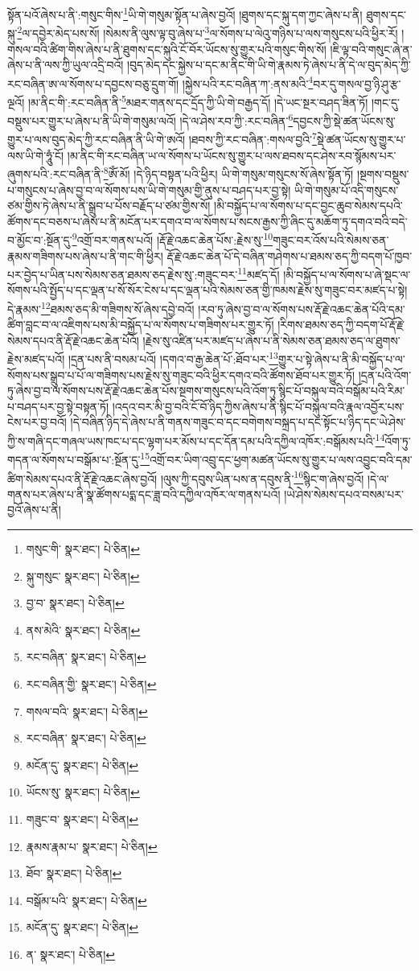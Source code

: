 སྟོན་པའོ་ཞེས་པ་ནི་:གསུང་གིས་\footnote{གསུང་གི་  སྣར་ཐང་།  པེ་ཅིན། }ཡི་གེ་གསུམ་སྟོན་པ་ཞེས་བྱའོ། །ཐུགས་དང་སྐུ་དག་ཀྱང་ཞེས་པ་ནི། ཐུགས་དང་སྐུ་\footnote{སྐུ་གསུང་  སྣར་ཐང་།  པེ་ཅིན། }ལ་དབྱེར་མེད་པས་སོ། །སེམས་ནི་ལུས་ལྟ་བུ་ཞེས་པ་\footnote{བྱ་བ་  སྣར་ཐང་།  པེ་ཅིན། }ལ་སོགས་པ་ལེའུ་གཉིས་པ་ལས་གསུངས་པའི་ཕྱིར་རོ། །གསལ་བའི་ཚིག་གིས་ཞེས་པ་ནི་ཐུགས་དང་སྐུའི་ངོ་བོར་ཡོངས་སུ་གྱུར་པའི་གསུང་གིས་སོ། །ཇི་ལྟ་བའི་གསུང་ཞེ་ན་ཞེས་པ་ནི་ལས་ཀྱི་ཡུལ་འདྲི་བའོ། །བུད་མེད་དང་སྐྱེས་པ་དང་མ་ནིང་གི་ཡི་གེ་རྣམས་ཏེ་ཞེས་པ་ནི་དེ་ལ་བུད་མེད་ཀྱི་རང་བཞིན་ཨ་ལ་སོགས་པ་དབྱངས་བཅུ་དྲུག་གོ། །སྐྱེས་པའི་རང་བཞིན་ཀ་:ནས་མའི་\footnote{ནས་མེའི་  སྣར་ཐང་།  པེ་ཅིན། }བར་དུ་གསལ་བྱ་ཉི་ཤུ་རྩ་ལྔའོ། །མ་ནིང་གི་:རང་བཞིན་ནི་\footnote{རང་བཞིན་  སྣར་ཐང་།  པེ་ཅིན། }མཐར་གནས་དང་དྲོད་ཀྱི་ཡི་གེ་བརྒྱད་དོ། །དེ་ཡང་སྔར་བཤད་ཟིན་ཏོ། །གང་དུ་བསྡུས་པར་གྱུར་པ་ཞེས་པ་ནི་ཡི་གེ་གསུམ་ལའོ། །དེ་ལ་ཤེས་རབ་ཀྱི་:རང་བཞིན་\footnote{རང་བཞིན་གྱི་  སྣར་ཐང་།  པེ་ཅིན། }དབྱངས་ཀྱི་སྡེ་ཚན་ཡོངས་སུ་གྱུར་པ་ལས་བུད་མེད་ཀྱི་རང་བཞིན་ནི་ཡི་གེ་ཨའོ། །ཐབས་ཀྱི་རང་བཞིན་:གསལ་བྱའི་\footnote{གསལ་བའི་  སྣར་ཐང་།  པེ་ཅིན། }སྡེ་ཚན་ཡོངས་སུ་གྱུར་པ་ལས་ཡི་གེ་ཧཱུཾ་ངོ། །མ་ནིང་གི་རང་བཞིན་ཡ་ལ་སོགས་པ་ཡོངས་སུ་གྱུར་པ་ལས་ཐབས་དང་ཤེས་རབ་སྙོམས་པར་ཞུགས་པའི་:རང་བཞིན་ནི་\footnote{རང་བཞིན་  སྣར་ཐང་།  པེ་ཅིན། }ཨོཾ་མོ། །དེ་ཉིད་བསྟན་པའི་ཕྱིར། ཡི་གེ་གསུམ་གསུངས་སོ་ཞེས་སྟོན་ཏོ། །སྔགས་བསྡུས་པ་གསུངས་པ་ཞེས་བྱ་བ་ལ་སོགས་པས་ཡི་གེ་གསུམ་གྱི་ནུས་པ་བཤད་པར་བྱ་སྟེ། ཡི་གེ་གསུམ་པོ་འདི་གསུངས་ཙམ་གྱིས་ཏེ་ཞེས་པ་ནི་སྒྲུབ་པ་པོས་བརྗོད་པ་ཙམ་གྱིས་སོ། །མི་བསྐྱོད་པ་ལ་སོགས་པ་དང་བྱང་ཆུབ་སེམས་དཔའི་ཚོགས་དང་བཅས་པ་ཞེས་པ་ནི་མངོན་པར་དགའ་བ་ལ་སོགས་པ་སངས་རྒྱས་ཀྱི་ཞིང་དུ་མཆོག་ཏུ་དགའ་བའི་བདེ་བ་མྱོང་བ་:སྔོན་དུ་\footnote{མངོན་དུ་  སྣར་ཐང་།  པེ་ཅིན། }འགྲོ་བར་གནས་པའོ། །རྡོ་རྗེ་འཆང་ཆེན་པོས་:རྗེས་སུ་\footnote{ཡོངས་སུ་  སྣར་ཐང་།  པེ་ཅིན། }གཟུང་བར་འོས་པའི་སེམས་ཅན་རྣམས་གཟིགས་པས་ཞེས་པ་ནི་གང་གི་ཕྱིར། རྡོ་རྗེ་འཆང་ཆེན་པོ་དེ་བཞིན་གཤེགས་པ་ཐམས་ཅད་ཀྱི་བདག་པོ་ཁྱབ་པར་བྱེད་པ་ཡིན་པས་སེམས་ཅན་ཐམས་ཅད་རྗེས་སུ་:གཟུང་བར་\footnote{གཟུང་བ་  སྣར་ཐང་།  པེ་ཅིན། }མཛད་དོ། །མི་བསྐྱོད་པ་ལ་སོགས་པ་ཞེ་སྡང་ལ་སོགས་པའི་སྤྱོད་པ་དང་ལྡན་པ་སོ་སོར་ངེས་པ་དང་ལྡན་པའི་སེམས་ཅན་གྱི་ཁམས་རྗེས་སུ་གཟུང་བར་མཛད་པ་སྟེ། དེ་རྣམས་\footnote{རྣམས་རྣམ་པ་  སྣར་ཐང་།  པེ་ཅིན། }ཐམས་ཅད་མི་གཟིགས་སོ་ཞེས་དབྱེ་བའོ། །རབ་ཏུ་ཞེས་བྱ་བ་ལ་སོགས་པས་རྡོ་རྗེ་འཆང་ཆེན་པོའི་དམ་ཚིག་བླང་བ་ལ་འཇིགས་པས་མི་བསྐྱོད་པ་ལ་སོགས་པ་གཟིགས་པར་གྱུར་ཏོ། །རིགས་ཐམས་ཅད་ཀྱི་བདག་པོ་རྡོ་རྗེ་སེམས་དཔའ་ནི་རྡོ་རྗེ་འཆང་ཆེན་པོའོ། །རྗེས་སུ་འཛིན་པར་མཛད་པ་ཞེས་པ་ནི་སེམས་ཅན་ཐམས་ཅད་ལ་ཐུགས་རྗེས་མཛད་པའོ། །དྲན་པས་ནི་བསམ་པའོ། །དགའ་བ་རྒྱ་ཆེན་པོ་:ཐོབ་པར་\footnote{ཐོབ་  སྣར་ཐང་།  པེ་ཅིན། }གྱུར་པ་སྟེ་ཞེས་པ་ནི་མི་བསྐྱོད་པ་ལ་སོགས་པས་སྒྲུབ་པ་པོ་ལ་གཟིགས་པས་རྗེས་སུ་གཟུང་བའི་ཕྱིར་དགའ་བའི་ཚོགས་ཐོབ་པར་གྱུར་ཏོ། །དྲན་པའི་འོག་ཏུ་ཞེས་བྱ་བ་ལ་སོགས་པས་རྡོ་རྗེ་འཆང་ཆེན་པོས་སྔགས་གསུངས་པའི་འོག་ཏུ་སྙིང་པོ་བསྐུལ་བའི་བསྒོམ་པའི་རིམ་པ་བཤད་པར་བྱ་སྟེ་བསྟན་ཏོ། །འདའ་བར་མི་བྱ་བའི་ངོ་བོ་ཉིད་ཀྱིས་ཞེས་པ་ནི་སྙིང་པོ་བསྐུལ་བའི་རྣལ་འབྱོར་པས་ངེས་པར་བྱ་བའོ། །དེ་བཞིན་ཉིད་དེ་ཞེས་པ་ནི་གནས་གཟུང་བ་དང་བགེགས་བསྐྲད་པ་དང་སྟོང་པ་ཉིད་དང་ཡེ་ཤེས་ཀྱི་ས་གཞི་དང་གཞལ་ཡས་ཁང་པ་དང་ལྷག་པར་མོས་པ་དང་དོན་དམ་པའི་དཀྱིལ་འཁོར་:བསྒོམས་པའི་\footnote{བསྒོམ་པའི་  སྣར་ཐང་།  པེ་ཅིན། }འོག་ཏུ་གདན་ལ་སོགས་པ་བསྒོམ་པ་:སྔོན་དུ་\footnote{མངོན་དུ་  སྣར་ཐང་།  པེ་ཅིན། }འགྲོ་བར་ཡིག་འབྲུ་དང་ཕྱག་མཚན་ཡོངས་སུ་གྱུར་པ་ལས་འབྱུང་བའི་དམ་ཚིག་སེམས་དཔའ་ནི་རྡོ་རྗེ་འཆང་ཞེས་བྱའོ། །ལུས་ཀྱི་དབུས་ཡིན་པས་ན་དབུས་ནི་\footnote{ན་  སྣར་ཐང་།  པེ་ཅིན། }སྙིང་ག་ཞེས་བྱའོ། །དེ་ལ་གནས་པར་ཞེས་པ་ནི་སྣ་ཚོགས་པདྨ་དང་ཟླ་བའི་དཀྱིལ་འཁོར་ལ་གནས་པའོ། །ཡེ་ཤེས་སེམས་དཔའ་བསམ་པར་བྱའོ་ཞེས་པ་ནི། 